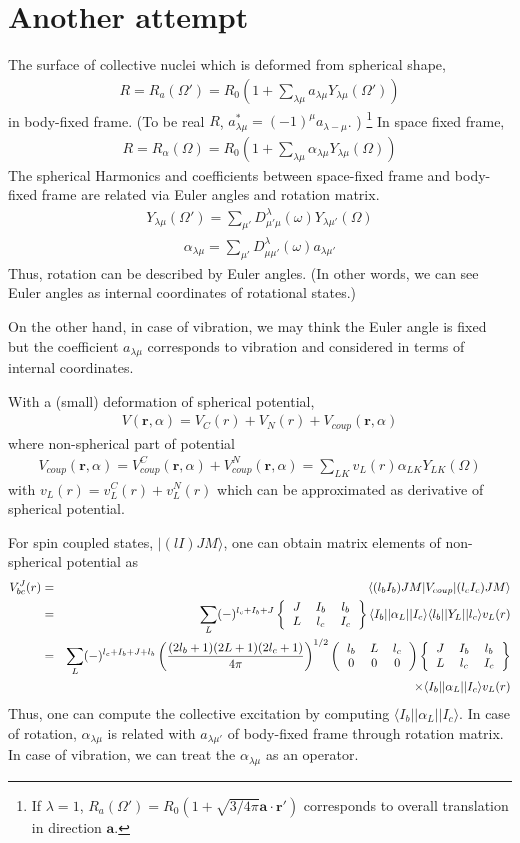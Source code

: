 \documentclass[11pt]{book}
\def\bm{\boldsymbol}
\def\vr{{\bm r}}
\def\la{\langle}
\def\ra{\rangle}
\newcommand{\bea}{\begin{eqnarray}}
\newcommand{\eea}{\end{eqnarray}}
\newcommand{\no}{\nonumber \\}
\newcommand{\threejsymbol}[6]{\left(\begin{tabular}{ccc} {$#1$}&{$#2$}&{$#3$}\\
                             {$#4$}&{$#5$}&{$#6$}\end{tabular}\right)}
\newcommand{\sixjsymbol}[6]{\left\{\begin{tabular}{ccc} {$#1$}&{$#2$}&{$#3$}\\
                             {$#4$}&{$#5$}&{$#6$} \end{tabular}\right\}}
\begin{document}
\section{Another attempt} 
The surface of collective nuclei which is deformed from spherical shape,
\bea 
R=R_a(\Omega') = R_0\left(1+\sum_{\lambda\mu} a_{\lambda\mu} Y_{\lambda\mu}(\Omega')\right)
\eea 
in body-fixed frame. (To be real $R$, $a^*_{\lambda\mu}=(-1)^\mu a_{\lambda -\mu}$. )
\footnote{If $\lambda=1$, 
$R_a(\Omega')=R_0(1+\sqrt{3/4\pi}{\bm a}\cdot{\bm r}')$
corresponds to overall translation in direction ${\bm a}$.
}
In space fixed frame,
\bea 
R=R_\alpha(\Omega) = R_0\left(1+\sum_{\lambda\mu} \alpha_{\lambda\mu} Y_{\lambda\mu}(\Omega)\right)
\eea 
The spherical Harmonics and coefficients between space-fixed frame and body-fixed frame
are related via Euler angles and rotation matrix. 
\bea 
Y_{\lambda\mu}(\Omega')=\sum_{\mu'} D^{\lambda}_{\mu'\mu}(\omega) Y_{\lambda\mu'}(\Omega)
\eea 
\bea 
\alpha_{\lambda\mu}=\sum_{\mu'} D^{\lambda}_{\mu\mu'}(\omega) a_{\lambda\mu'}
\eea 
Thus, rotation can be described by Euler angles. (In other words, we can see Euler angles 
as internal coordinates of rotational states.)

On the other hand, in case of vibration, we may think the Euler angle is fixed but
the coefficient $a_{\lambda\mu}$ corresponds to vibration and considered 
in terms of internal coordinates.  

With a (small) deformation of spherical potential,
\bea 
V(\vr,\alpha)=V_C(r)+V_N(r)+V_{coup}(\vr,\alpha)
\eea 
where non-spherical part of potential
\bea 
V_{coup}(\vr,\alpha)=V_{coup}^C(\vr,\alpha)+V^N_{coup}(\vr,\alpha)
 =\sum_{LK} v_L(r) \alpha_{L K} Y_{LK}(\Omega)
\eea 
with $v_L(r)=v_L^C(r)+v^N_L(r)$ which can be approximated as derivative of spherical potential. 

For spin coupled states, $|(l I) J M\ra $, one can obtain matrix elements of non-spherical potential as
\bea 
V_{bc}^J(r)&=& \la (l_b I_b)JM| V_{coup}|(l_c I_c)J M\ra \no 
           &=& \sum_{L} (-)^{l_c+I_b+J}\sixjsymbol{J}{I_b}{l_b}{L}{l_c}{I_c}
               \la I_b||\alpha_L||I_c\ra \la l_b||Y_L||l_c\ra  v_L(r) \no 
           &=&\sum_{L} (-)^{l_c+I_b+J+l_b}
             \left(\frac{(2l_b+1)(2L+1)(2l_c+1)}{4\pi} \right)^{1/2}      
             \threejsymbol{l_b}{L}{l_c}{0}{0}{0}
             \sixjsymbol{J}{I_b}{l_b}{L}{l_c}{I_c}
             \no & &\times 
             \la I_b||\alpha_L||I_c\ra v_L(r) 
\eea 
Thus, one can compute the collective excitation by computing $\la I_b||\alpha_L||I_c\ra $. 
In case of rotation, $\alpha_{\lambda\mu}$ is related with $a_{\lambda\mu'}$
of body-fixed frame through rotation matrix. In case of vibration, we can treat the
$\alpha_{\lambda\mu}$ as an operator. 
 
\end{document}
